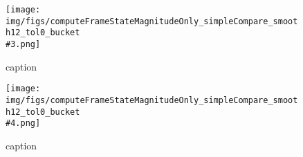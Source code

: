 %
\begin{figure}[!ht]
	\centering
	\texttt{[image: img/figs/computeFrameStateMagnitudeOnly\_simpleCompare\_smooth12\_tol0\_bucket\\\#3.png]}
	\caption{caption}
	\label{fig:computeFrameStateMagnitudeOnly_simpleCompare_smooth12_tol0_bucket\#3.png}
\end{figure}
%
\begin{figure}[!ht]
	\centering
	\texttt{[image: img/figs/computeFrameStateMagnitudeOnly\_simpleCompare\_smooth12\_tol0\_bucket\\\#4.png]}
	\caption{caption}
	\label{fig:computeFrameStateMagnitudeOnly_simpleCompare_smooth12_tol0_bucket\#4.png}
\end{figure}
%
